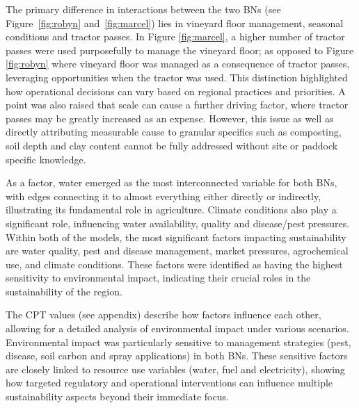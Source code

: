 The primary difference in interactions between the two BNs (see Figure~\ref{fig:robyn} and~\ref{fig:marcel}) lies in vineyard floor management, seasonal conditions and tractor passes. In Figure \ref{fig:marcel}, a higher number of tractor passes were used purposefully to manage the vineyard floor; as opposed to Figure \ref{fig:robyn} where vineyard floor was managed as a consequence of tractor passes, leveraging opportunities when the tractor was used. 
This distinction highlighted how operational decisions can vary based on regional practices and priorities. A point was also raised that scale can cause a further driving factor, where tractor passes may be greatly increased as an expense.
However, this issue as well as directly attributing measurable cause to granular specifics such as composting, soil depth and clay content cannot be fully addressed without site or paddock specific knowledge.

As a factor, water emerged as the most interconnected variable for both BNs, with edges connecting it to almost everything either directly or indirectly, illustrating its fundamental role in agriculture. Climate conditions also play a significant role, influencing water availability, quality and disease/pest pressures.
Within both of the models, the most significant factors impacting sustainability are water quality, pest and disease management, market pressures, agrochemical use, and climate conditions. These factors were identified as having the highest sensitivity to environmental impact, indicating their crucial roles in the sustainability of the region.

The CPT values (see appendix) describe how factors influence each other, allowing for a detailed analysis of environmental impact under various scenarios. Environmental impact was particularly sensitive to management strategies (pest, disease, soil carbon and spray applications) in both BNs. These sensitive factors are closely linked to resource use variables (water, fuel and electricity), showing how targeted regulatory and operational interventions can influence multiple sustainability aspects beyond their immediate focus. 

